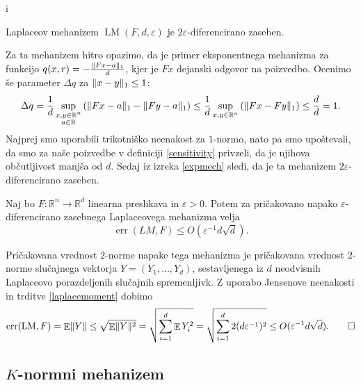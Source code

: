 i\documentclass[mat1]{fmfdelo}
\DeclarePairedDelimiter{\norm}{\lVert}{\rVert}
\newcommand{\R}{\mathbb R}
\DeclareMathOperator*{\E}{\mathbb E}
\DeclareMathOperator*{\err}{err}
\newcommand{\query}{F: \R^n \to \R^d}
\begin{document}
\begin{trditev}
    Laplaceov mehanizem $\operatorname{LM}(F, d, \varepsilon)$ je $2\varepsilon$-diferencirano zaseben.
\end{trditev}
\begin{dokaz}
    Za ta mehanizem hitro opazimo, da je primer eksponentnega mehanizma za funkcijo $q(x, r) = -\frac{\norm{Fx-a}_1}{d}$, kjer je $Fx$ dejanski odgovor na poizvedbo. Ocenimo še parameter $\Delta q$ za $\norm{x-y}_1 \leq 1$:
    \begin{equation*}
        \Delta q = \frac{1}{d} \sup_{\substack{x,y \in \R^n\\ a \in \R}} \left(\norm{Fx-a}_1-\norm{Fy-a}_1 \right) \leq
        \frac{1}{d} \sup_{x,y \in \R^n} \left(\norm{Fx - Fy}_1 \right) \leq \frac{d}{d} = 1.
    \end{equation*}
    Najprej smo uporabili trikotniško neenakost za $1$-normo, nato pa smo upoštevali, da smo za naše poizvedbe v definiciji \ref{sensitivity} privzeli, da je njihova občutljivost manjša od $d$.
    Sedaj iz izreka \ref{expmech} sledi, da je ta mehanizem $2\varepsilon$-diferencirano zaseben.
\end{dokaz}


\begin{trditev}
    Naj bo $\query$ linearna preslikava in $\varepsilon > 0$. Potem za pričakovano napako $\varepsilon$-diferencirano zasebnega Laplaceovega mehanizma velja
    \begin{equation*}
        \err(LM, F) \leq O(\varepsilon^{-1} d \sqrt{d}).
    \end{equation*}
\end{trditev}
    
\begin{dokaz}
    Pričakovana vrednost $2$-norme napake tega mehanizma je pričakovana vrednost $2$-norme slučajnega vektorja $Y=(Y_1,\dots,Y_d)$, sestavljenega iz $d$ neodvisnih Laplaceovo porazdeljenih slučajnih spremenljivk. Z uporabo Jensenove neenakosti in trditve \ref{laplacemoment} dobimo
    \begin{equation*}
    \err(\operatorname{LM}, F) = \E \norm{Y} \leq \sqrt{\E \norm{Y}^2} = \sqrt{\sum_{i=1}^d \E Y_i^2} = \sqrt{\sum_{i=1}^d 2(d\varepsilon^{-1})^2} \leq O( \varepsilon^{-1} d \sqrt{d}). \qedhere
    \end{equation*}
\end{dokaz}


\subsection{\texorpdfstring{$K$-normni mehanizem}{K-normni mehanizem}}
\end{document}
